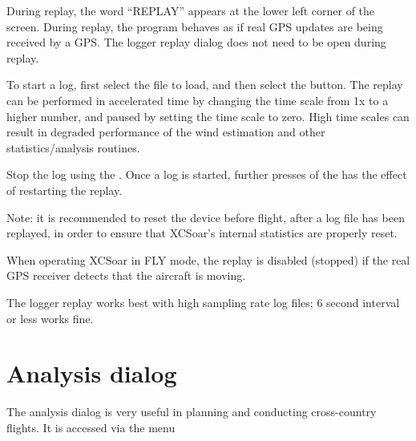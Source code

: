During replay, the word ``REPLAY'' appears at the lower left corner of
the screen.  During replay, the program behaves as if real GPS updates
are being received by a GPS.  The logger replay dialog does not need
to be open during replay.

To start a log, first select the file to load, and then select the
 button.  The replay can be performed in accelerated time
by changing the time scale from 1x to a higher number, and paused by
setting the time scale to zero.  High time scales can result in degraded
performance of the wind estimation and other statistics/analysis routines.

Stop the log using the .
Once a log is started, further presses of the  has the
effect of restarting the replay.

Note: it is recommended to reset the device before flight, after a log
file has been replayed, in order to ensure that XCSoar's internal
statistics are properly reset.

When operating XCSoar in FLY mode, the replay is disabled (stopped) if
the real GPS receiver detects that the aircraft is moving.

The logger replay works best with high sampling rate log files;
6 second interval or less works fine.

\section{Analysis dialog}\label{sec:analysis-dialog-climb}

The analysis dialog is very useful in planning and conducting
cross-country flights.  It is accessed via the menu  
\begin{quote}
\blink{}
\end{quote}

